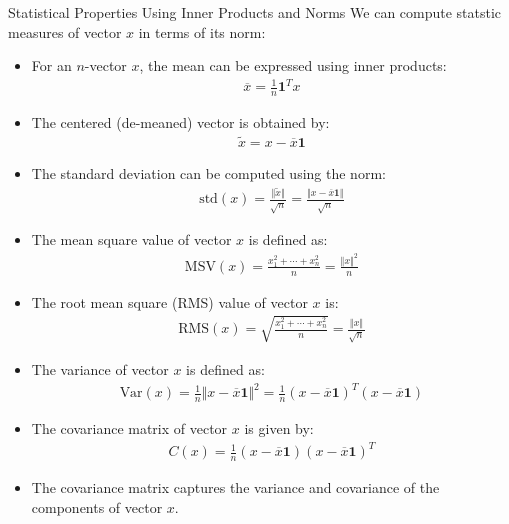 \begin{frame}{Statistical Properties Using Inner Products and Norms}
We can compute  statstic measures of vector $x$ in terms of its norm:
\begin{itemize}
    \item For an $n$-vector $x$, the mean can be expressed using inner products:
    \begin{align}
        \overline{x} = \frac{1}{n} \boldsymbol{1}^T x
    \end{align}
    \item The centered (de-meaned) vector is obtained by:
    \begin{align*}
        \tilde{x} = x - \overline{x} \boldsymbol{1}
    \end{align*}
    \item The standard deviation can be computed using the norm:
    \begin{align*}
        \text{std}(x) = \frac{\Vert \tilde{x} \Vert}{\sqrt{n}} = \frac{\Vert x - \overline{x} \boldsymbol{1} \Vert}{\sqrt{n}}
    \end{align*}
\end{itemize}
\end{frame}

\begin{frame}{}
\begin{itemize}
    \item The mean square value of vector $x$ is defined as:
    \begin{align}
        \text{MSV}(x) = \frac{x_1^2 + \cdots + x_n^2 }{n} = \frac{\Vert x \Vert^2 }{n}
    \end{align}
    \item The root mean square (RMS) value of vector $x$ is:
    \begin{align}
        \text{RMS}(x) = \sqrt{ \frac{x_1^2 + \cdots + x_n^2 }{n}} = \frac{\Vert x \Vert}{\sqrt{n}}
    \end{align}
\end{itemize}
\end{frame}
\begin{frame}
\begin{itemize}
    \item The variance of vector $x$ is defined as:
    \begin{align}
        \text{Var}(x) = \frac{1}{n} \Vert x - \overline{x} \boldsymbol{1} \Vert^2 = \frac{1}{n} (x - \overline{x} \boldsymbol{1})^T (x - \overline{x} \boldsymbol{1})
    \end{align}
    \item The covariance matrix of vector $x$ is given by:
    \begin{align}
        C(x) = \frac{1}{n} (x - \overline{x} \boldsymbol{1})(x - \overline{x} \boldsymbol{1})^T
    \end{align}
    \item The covariance matrix captures the variance and covariance of the components of vector $x$.
\end{itemize}
\end{frame}


